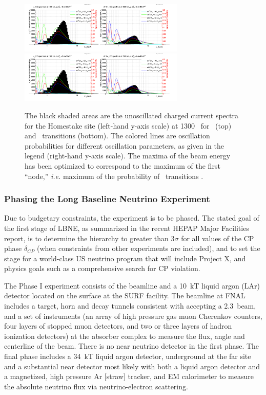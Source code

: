 \begin{figure}[tp]
\begin{center}
\includegraphics[width=0.7\textwidth]{RWK/LBNE/makefig1.pdf}
\includegraphics[width=0.7\textwidth]{RWK/LBNE/makefig2.pdf}
\caption{The black shaded areas are the unoscillated charged current spectra for the Homestake site (left-hand y-axis scale) at 1300 \km\ for \mutoe\ (top) and \mubartoebar\ transitions (bottom).  The colored lines are oscillation probabilities for different oscillation parameters, as given in the legend (right-hand y-axis scale). The maxima of the beam energy has been optimized to correspond to the  maximum of the first ``node,''  { \it{i.e.}} maximum of the probability of \mutoe\ transitions \cite{PWGReconfigurationReport}.}
\label{fig:BeamProfileNHandIH}
\end{center}
\end{figure}



\subsubsection{Phasing the Long Baseline Neutrino Experiment}

Due to budgetary constraints, the experiment is to be phased. 
The stated goal of the first stage of LBNE, as summarized in the recent HEPAP Major Facilities report, is to determine the hierarchy to greater than $3 \sigma$ for all values of the CP phase $\delta_{CP}$ (when constraints from other experiments are included), and to set the stage for a world-class US neutrino program that will include Project X, and physics goals such as a comprehensive search for CP violation.

The Phase I experiment consists of the beamline and a 10~kT liquid argon (LAr)
detector 
located on the surface at the SURF facility. The beamline at FNAL
includes a target, horn and decay tunnels consistent with accepting a
2.3\MW\ beam, and a set of instruments (an array of high pressure gas
muon Cherenkov counters, four layers of stopped muon detectors, and
two or three layers of hadron ionization detectors) at the absorber
complex to measure the flux, angle and centerline of the beam. There
is no near neutrino detector in the first phase.  The final phase
includes a 34~kT liquid argon detector, underground at the far site
and a substantial near detector most likely with  both a liquid argon
detector and a magnetized, high pressure Ar  [straw] tracker, and EM
calorimeter to measure the absolute neutrino flux via
neutrino-electron scattering. 

